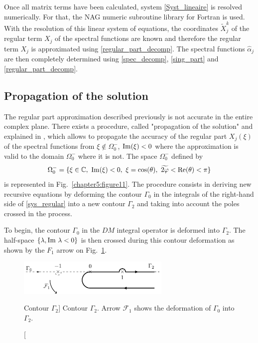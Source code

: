 Once all matrix terms have been calculated, system \eqref{Syst_lineaire} is resolved numerically. For that, the NAG numeric subroutine library for Fortran is used. With the resolution of this linear system of equations, the coordinates $\tilde{X}_j^k$ of the regular term $X_j$ of the spectral functions are known and therefore the regular term $X_j$ is approximated using \eqref{regular_part_decomp}. The spectral functions $\hat{\alpha}_j$ are then completely determined using \eqref{spec_decomp}, \eqref{sing_part} and \eqref{regular_part_decomp}. 

\subsection{Propagation of the solution}
\label{propag_sol}
The regular part approximation described previously is not accurate in the entire complex plane. There exists a procedure, called "propagation of the solution" and explained in \cite{CroisilleLebeau}, which allows to propagate the accuracy of the regular part $X_j(\xi)$ of the spectral functions from $\xi \notin \Omega_0^-$, ${\rm Im} (\xi) <0$ where the approximation is valid to the domain $\Omega_0^-$ where it is not. The space $\Omega_0^-$ defined by
\begin{equation}
\label{defomegamoins}
\Omega_0^- = \{\xi \in \mathbb C, \ {\rm Im}(\xi) <0, \  \xi=\cos(\theta), \ \widetilde{2\varphi} < {\rm Re}(\theta)<\pi\}
\end{equation}
is represented in Fig.~\ref{chapter5:figure11}. 
The procedure consists in deriving new recursive equations by deforming the  contour $\Gamma_0$ in the integrals of the right-hand side of \eqref{sys_regular} into a new contour $\Gamma_2$ and taking into account the poles crossed in the process.

To begin, the contour $\Gamma_0$ in the $DM$ integral operator is deformed into $\Gamma_2$. The half-space $\{ \lambda, {\rm Im} \ \lambda < 0 \}$ is then crossed during this contour deformation as shown by the $F_1$ arrow on Fig.~\ref{chapter5:figure8}.

\begin{figure}[ht]%
\begin{center}
  \includegraphics[width=0.65\textwidth]{images/chapter2/Figure6.pdf}
\end{center}
\caption
[Contour $\Gamma_2$]
{Contour $\Gamma_2$. Arrow $\mathcal{F}_1$ shows the deformation of $\Gamma_0$ into $\Gamma_2$.}
\label{chapter5:figure8}
\end{figure}


